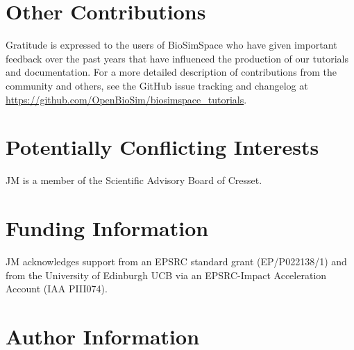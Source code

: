 \documentclass[9pt,tutorial]{livecoms}
\newcommand{\githubrepository}{\url{https://github.com/OpenBioSim/biosimspace_tutorials}}  %
\begin{document}
\section{Other Contributions}
%
Gratitude is expressed to the users of BioSimSpace who have given important feedback over the past years that have influenced the production of our tutorials and documentation. 
For a more detailed description of contributions from the community and others, see the GitHub issue tracking and changelog at \githubrepository.

\section{Potentially Conflicting Interests}
JM is a member of the Scientific Advisory Board of Cresset. 

\section{Funding Information}
JM acknowledges support from an EPSRC standard grant (EP/P022138/1) and from the University of Edinburgh UCB via an EPSRC-Impact Acceleration Account (IAA PIII074).

\section*{Author Information}
\makeorcid




\end{document}
